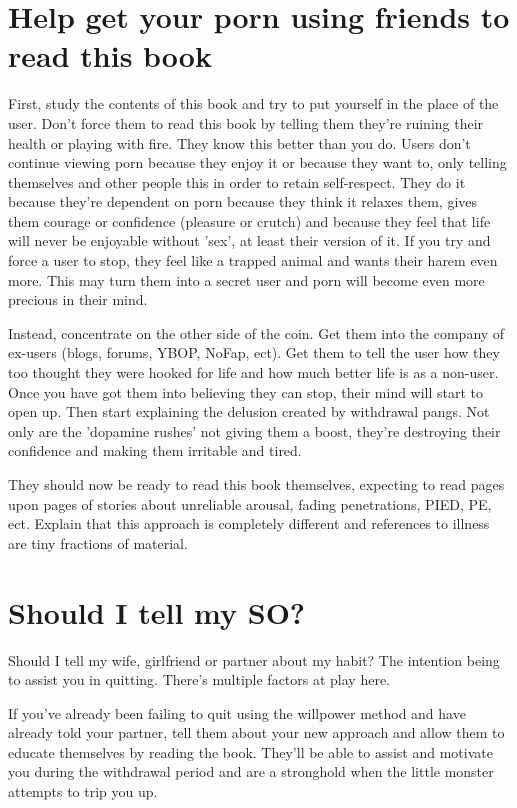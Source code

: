 \documentclass[easypeasy.tex]{subfiles}
\begin{document}
\section{Help get your porn using friends to read this book}

First, study the contents of this book and try to put yourself in the place of the user. Don't force them to read this book by telling them they're ruining their health or playing with fire. They know this better than you do. Users don't continue viewing porn because they enjoy it or because they want to, only telling themselves and other people this in order to retain self-respect. They do it because they're dependent on porn because they think it relaxes them, gives them courage or confidence (pleasure or crutch) and because they feel that life will never be enjoyable without 'sex', at least their version of it. If you try and force a user to stop, they feel like a trapped animal and wants their harem even more. This may turn them into a secret user and porn will become even more precious in their mind.

Instead, concentrate on the other side of the coin. Get them into the company of ex-users (blogs, forums, YBOP, NoFap, ect). Get them to tell the user how they too thought they were hooked for life and how much better life is as a non-user. Once you have got them into believing they can stop, their mind will start to open up. Then start explaining the delusion created by withdrawal pangs. Not only are the 'dopamine rushes' not giving them a boost, they're destroying their confidence and making them irritable and tired.

They should now be ready to read this book themselves, expecting to read pages upon pages of stories about unreliable arousal, fading penetrations, PIED, PE, ect. Explain that this approach is completely different and references to illness are tiny fractions of material.

\section{Should I tell my SO?}

Should I tell my wife, girlfriend or partner about my habit? The intention being to assist you in quitting. There's multiple factors at play here.

If you've already been failing to quit using the willpower method and have already told your partner, tell them about your new approach and allow them to educate themselves by reading the book. They'll be able to assist and motivate you during the withdrawal period and are a stronghold when the little monster attempts to trip you up.
\end{document}
